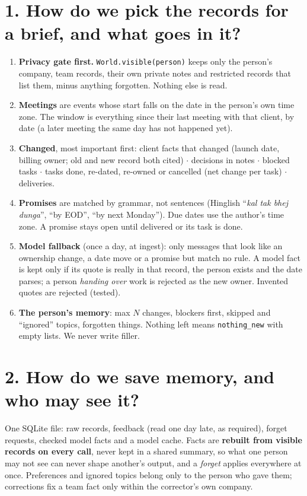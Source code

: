 \documentclass[10pt,a4paper]{article}
\newcommand{\code}[1]{\texttt{\small #1}}
\begin{document}
\section{1. How do we pick the records for a brief, and what goes in it?}
\begin{enumerate}
  \item \textbf{Privacy gate first.} \code{World.visible(person)} keeps only the person's company, team records,
        their own private notes and restricted records that list them, minus anything forgotten. Nothing else is read.
  \item \textbf{Meetings} are events whose start falls on the date in the person's own time zone. The window is
        everything since their last meeting with that client, by date (a later meeting the same day has not happened yet).
  \item \textbf{Changed}, most important first: client facts that changed (launch date, billing owner; old and new
        record both cited) $\cdot$ decisions in notes $\cdot$ blocked tasks $\cdot$ tasks done, re-dated, re-owned
        or cancelled (net change per task) $\cdot$ deliveries.
  \item \textbf{Promises} are matched by grammar, not sentences (Hinglish ``\emph{kal tak bhej dunga}'', ``by EOD'',
        ``by next Monday''). Due dates use the author's time zone. A promise stays open until delivered or its task is done.
  \item \textbf{Model fallback} (once a day, at ingest): only messages that look like an ownership change, a date move or a
        promise but match no rule. A model fact is kept only if its quote is really in that record, the person exists and
        the date parses; a person \emph{handing over} work is rejected as the new owner. Invented quotes are rejected (tested).
  \item \textbf{The person's memory}: max $N$ changes, blockers first, skipped and ``ignored'' topics, forgotten things.
        Nothing left means \code{nothing\_new} with empty lists. We never write filler.
\end{enumerate}

\section{2. How do we save memory, and who may see it?}
One SQLite file: raw records, feedback (read one day late, as required), forget requests, checked model facts and a model
cache. Facts are \textbf{rebuilt from visible records on every call}, never kept in a shared summary, so what one person may
not see can never shape another's output, and a \emph{forget} applies everywhere at once. Preferences and ignored topics
belong only to the person who gave them; corrections fix a team fact only within the corrector's own company.
\end{document}
